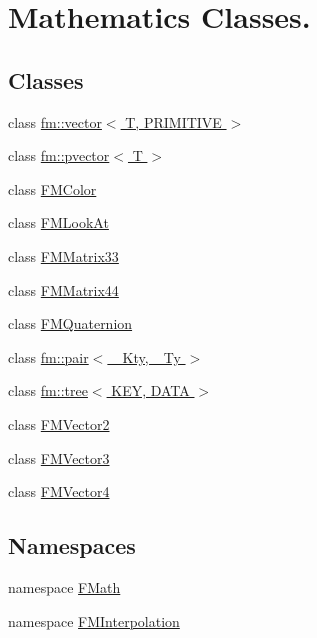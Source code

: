 \hypertarget{group__FMath}{
\section{Mathematics Classes.}
\label{group__FMath}
}
\subsection*{Classes}
\begin{DoxyCompactItemize}
\item 
class \hyperlink{classfm_1_1vector}{fm::vector$<$ T, PRIMITIVE $>$}
\item 
class \hyperlink{classfm_1_1pvector}{fm::pvector$<$ T $>$}
\item 
class \hyperlink{classFMColor}{FMColor}
\item 
class \hyperlink{classFMLookAt}{FMLookAt}
\item 
class \hyperlink{classFMMatrix33}{FMMatrix33}
\item 
class \hyperlink{classFMMatrix44}{FMMatrix44}
\item 
class \hyperlink{classFMQuaternion}{FMQuaternion}
\item 
class \hyperlink{classfm_1_1pair}{fm::pair$<$ \_\-Kty, \_\-Ty $>$}
\item 
class \hyperlink{classfm_1_1tree}{fm::tree$<$ KEY, DATA $>$}
\item 
class \hyperlink{classFMVector2}{FMVector2}
\item 
class \hyperlink{classFMVector3}{FMVector3}
\item 
class \hyperlink{classFMVector4}{FMVector4}
\end{DoxyCompactItemize}
\subsection*{Namespaces}
\begin{DoxyCompactItemize}
\item 
namespace \hyperlink{namespaceFMath}{FMath}
\item 
namespace \hyperlink{namespaceFMInterpolation}{FMInterpolation}
\end{DoxyCompactItemize}
